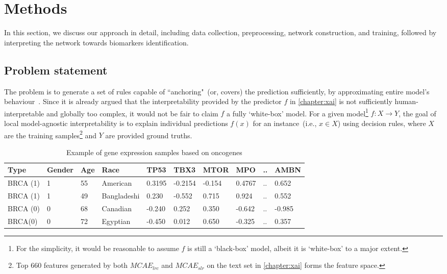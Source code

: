 \section{Methods} \label{chapter_7:mm}
In this section, we discuss our approach in detail, including data collection, preprocessing, network construction, and training, followed by interpreting the network towards biomarkers identification. 

\subsection{Problem statement}
The problem is to generate a set of rules capable of ``anchoring"~(or, covers) the prediction sufficiently, by approximating entire model's behaviour~\cite{ribeiro2018anchors}. Since it is already argued that the interpretability provided by the predictor ${f}$ in \cref{chapter:xai} is not sufficiently human-interpretable and globally too complex, it would not be fair to claim ${f}$ a fully `white-box' model. For a given model\footnote{For the simplicity, it would be reasonable to assume ${f}$ is  still a `black-box' model, albeit it is `white-box' to a major extent.} ${f}: X \rightarrow Y$, the goal of local model-agnostic interpretability is to explain individual predictions ${f}(x)$ for an instance~(i.e., $x \in X$) using decision rules, where $X$ are the training samples\footnote{Top 660 features generated by both $MCAE_{lrc}$ and $MCAE_{slr}$ on the text set in \cref{chapter:xai} forms the feature space.} and $Y$ are provided ground truths. %

\begin{table}[h!]
    \caption{Example of gene expression samples based on oncogenes}
    \label{ge:ancor_example}
    \vspace{-6mm}
    \begin{center}
        \scriptsize
        \begin{tabular}{l|l|l|l|l|l|l|l|l|l}
            \hline
            \rowcolor{Gray}
            \textbf{Type} & \textbf{Gender} & \textbf{Age} & \textbf{Race} & \textbf{TP53} & \textbf{TBX3} & \textbf{MTOR} & \textbf{MPO}  & .. & \textbf{AMBN} \\\hline    
            BRCA (1) & 1 & 55 & American & 0.3195 & -0.2154 & -0.154 & 0.4767  & .. & 0.652 \\\hline
            BRCA (1) & 1 & 49 & Bangladeshi & 0.230 &  -0.552  & 0.715  & 0.924   & .. & 0.552 \\\hline
            BRCA (0) & 0 & 68 & Canadian & -0.240 &  0.252  & 0.350  & -0.642  & .. & -0.985 \\\hline
            BRCA(0) & 0 & 72 & Egyptian & -0.450 &  0.012  & 0.650  & -0.325  & .. & 0.357 \\\hline
        \end{tabular}
        \vspace{-4mm}
    \end{center}
\end{table}

